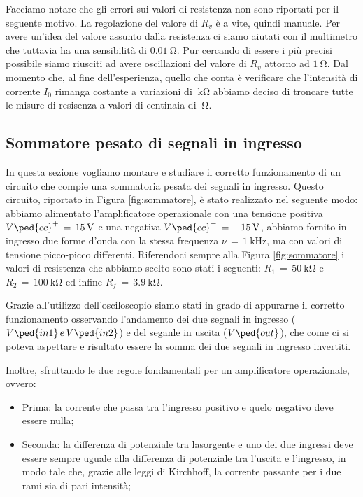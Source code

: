 Facciamo notare che gli errori sui valori di resistenza non sono riportati per il seguente motivo. 
La regolazione del valore di $R_v$ è a vite, quindi manuale.
Per avere un'idea del valore assunto dalla resistenza ci siamo aiutati con il multimetro che tuttavia ha una sensibilità di $\SI{0.01}{\ohm}$. Pur cercando di essere i più precisi possibile siamo riusciti ad avere oscillazioni del valore di $R_v$ attorno ad $\SI{1}{\ohm}$. Dal momento che, al fine dell'esperienza, quello che conta è verificare che l'intensità di corrente $I_0$ rimanga costante a variazioni di $\SI{}{\kilo\ohm}$ abbiamo deciso di troncare tutte le misure di resisenza a valori di centinaia di $\SI{}{\ohm}$.

\subsection*{Sommatore pesato di segnali in ingresso}

In questa sezione vogliamo montare e studiare il corretto funzionamento di un circuito che compie una sommatoria pesata dei segnali in ingresso. Questo circuito, riportato in Figura \ref{fig:sommatore}, è stato realizzato nel seguente modo: abbiamo alimentato l'amplificatore operazionale con una tensione positiva $V\ped{cc}^+\,=\,\SI{+15}{\volt}$ e una negativa $V\ped{cc}^-\,=\,\SI{-15}{\volt}$, abbiamo fornito in ingresso due forme d'onda con la stessa frequenza $\nu\,=\,\SI{1}{\kilo\hertz}$, ma con valori di tensione picco-picco differenti. Riferendoci sempre alla Figura \ref{fig:sommatore} i valori di resistenza che abbiamo scelto sono stati i seguenti: $R_1\,=\,\SI{50}{\kilo\ohm}$ e $R_2\,=\,\SI{100}{\kilo\ohm}$ ed infine $R_f\,=\,\SI{3.9}{\kilo\ohm}$.

Grazie all'utilizzo dell'osciloscopio siamo stati in grado di appurarne il corretto funzionamento osservando l'andamento dei due segnali in ingresso ($V\ped{in1}\,e\,V\ped{in2} $) e del seganle in uscita ($V\ped{out}$), che come ci si poteva aspettare e risultato essere la somma dei due segnali in ingresso invertiti.

Inoltre, sfruttando le due regole fondamentali per un amplificatore operazionale, ovvero:
\begin{itemize}
	\item{Prima: la corrente che passa tra l'ingresso positivo e quelo negativo deve essere nulla;}
	\item{Seconda: la differenza di potenziale tra lasorgente e uno dei due ingressi deve essere sempre uguale alla differenza di potenziale tra l'uscita e l'ingresso, in modo tale che, grazie alle leggi di Kirchhoff, la corrente passante per i due rami sia di pari intensità;}
\end{itemize}










